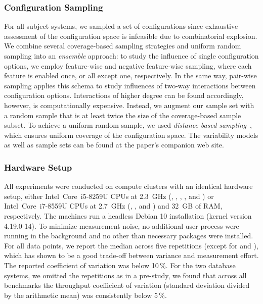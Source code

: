 \subsubsection*{Configuration Sampling}
For all subject systems, we sampled a set of configurations since exhaustive assessment of the configuration space is infeasible due to combinatorial explosion. We combine several coverage-based sampling strategies and uniform random sampling into an \emph{ensemble} approach: to study the influence of single configuration options, we employ feature-wise and negative feature-wise sampling, where each feature is enabled once, or all except one, respectively. In the same way, pair-wise sampling applies this schema to study influences of two-way interactions between configuration options. Interactions of higher degree can be found accordingly, however, is computationally expensive. Instead, we augment our sample set with a random sample that is at least twice the size of the coverage-based sample subset. To achieve a uniform random sample, we used \emph{distance-based sampling}~\cite{kaltenecker_distance-based_2019}, which ensures uniform coverage of the configuration space. The variability models as well as sample sets can be found at the paper's companion web site.


\subsubsection*{Hardware Setup}
All experiments were conducted on compute clusters with an identical hardware setup, either Intel~Core~i5-8259U CPUs at 2.3~GHz (, , , , and ) or Intel~Core~i7-8559U CPUs at 2.7~GHz (, , and ) and 32~GB of RAM, respectively. The machines run a headless Debian 10 installation (kernel version \mbox{4.19.0-14}). To minimize measurement noise, no additional user process were running in the background and no other than necessary packages were installed.
For all data points, we report the median across five repetitions (except for  and ), which has shown to be a good trade-off between variance and measurement effort. The reported coefficient of variation was below {\color{Red}10\,\%}. For the two database systems, we omitted the repetitions as in a pre-study, we found that across all benchmarks the throughput coefficient of variation (standard deviation divided by the arithmetic mean) was consistently below 5\,\%.

